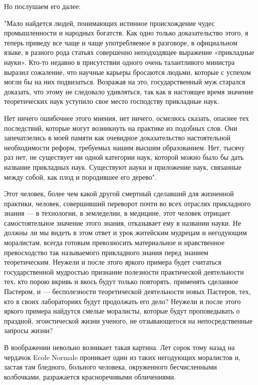 Но послушаем его далее:

"Мало   найдется  людей,   понимающих  истинное   происхождение  чудес
промышленности  и народных  богатств. Как  одно только  доказательство
этого, я теперь  приведу все чаще и чаще употребляемое  в разговоре, в
официальном  языке, в  разного  рода  статьях совершенно  неподходящее
выражение  «прикладные науки».  Кто-то  недавно  в присутствии  одного
очень  талантливого министра  выразил сожаление,  что научные  карьеры
бросаются  людьми, которые  с  успехом могли  бы  на них  подвизаться.
Возражая на это,  государственный муж старался доказать,  что этому не
следовало удивляться, так как в настоящее время значение теоретических
наук уступило свое место господству прикладные наук.

Нет  ничего  ошибочнее этого  мнения,  нет  ничего, осмелюсь  сказать,
опаснее  тех  последствий, которые  могут  возникнуть  на практике  из
подобных  слов.   Они  запечатлелись  в  моей   памяти  как  очевидное
доказательство  настоятельной  необходимости реформ,  требуемых  нашим
высшим  образованием. Нет,  тысячу  раз нет,  не  существует ни  одной
категории наук, которой  можно было бы дать  название прикладных наук.
Существуют науки и приложение наук,  связанные между собой, как плод и
породившее его дерево".

Этот человек, более чем какой  другой смертный сделавший для жизненной
практики,  человек,  совершивший  переворот  почти  во  всех  отраслях
прикладного знания  --- в технологии,  в земледелии, в  медицине, этот
человек  отрицает самостоятельное  значение  этого знания,  отказывает
ему  в  названии  науки.  Не  должны  ли мы  видеть  в  этом  ответ  и
урок  житейским  мудрецам  и  негодующим  моралистам,  всегда  готовым
превозносить материальное и нравственное превосходство так называемого
прикладного  знания  перед  знанием  теоретическим.  Неужели  и  после
этого  яркого   примера  будет  считаться   государственной  мудростью
признание полезности практической деятельности тех, кто порою вкривь и
вкось  будут только  повторять,  применять сделанное  Пастером, и  ---
бесполезности теоретической  деятельности новых  Пастеров, тех,  кто в
своих лабораториях  будут продолжать его  дело? Неужели и  после этого
яркого примера найдутся смелые  моралисты, которые будут проповедывать
о  праздной,   эгоистической  жизни   ученого,  не   отзывающегося  на
непосредственные запросы жизни?

В  воображении  невольно  возникает  такая  картина.  Лет  сорок  тому
назад на  чердачок Ecole  Normale проникает  один из  таких негодующих
моралистов  и, застав  там  бледного,  больного человека,  окруженного
бесчисленными колбочками, разражается красноречивыми обличениями.

